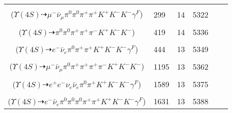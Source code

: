 \documentclass[landscape]{article}
\newcounter{rownumbers}
\newcommand\rn{\stepcounter{rownumbers}\arabic{rownumbers}}
\newcommand{\EOL}{\\} %
\newcommand{\topoTags}[1]{#1} %
\begin{document}
\begin{longtable}{clcccc}
\rn & \makecell[l]{ $ 
\Upsilon(4S) \rightarrow B^{0} \bar{B}^{0} ,
B^{0} \rightarrow \pi^{0} K^{+} K^{-} ,
\bar{B}^{0} \rightarrow \mu^{-} \bar{\nu}_{\mu} D^{*+} \gamma^{F} ,
D^{*+} \rightarrow \pi^{+} D^{0} ,
D^{0} \rightarrow \pi^{0} \pi^{+} K^{-} 
$ \\ ($
\Upsilon(4S) \dashrightarrow \mu^{-} \bar{\nu}_{\mu} \pi^{0} \pi^{0} \pi^{+} \pi^{+} K^{+} K^{-} K^{-} \gamma^{F} 
$) } & \topoTags{299 & }14 & 5322 \EOL

\rn & \makecell[l]{ $ 
\Upsilon(4S) \rightarrow B^{0} \bar{B}^{0} ,
B^{0} \rightarrow \pi^{0} K^{+} K^{-} ,
\bar{B}^{0} \rightarrow \rho^{-} D^{+} ,
\rho^{-} \rightarrow \pi^{0} \pi^{-} ,
D^{+} \rightarrow \pi^{+} \pi^{+} K^{-} 
$ \\ ($
\Upsilon(4S) \dashrightarrow \pi^{0} \pi^{0} \pi^{+} \pi^{+} \pi^{-} K^{+} K^{-} K^{-} 
$) } & \topoTags{419 & }14 & 5336 \EOL

\rn & \makecell[l]{ $ 
\Upsilon(4S) \rightarrow B^{0} \bar{B}^{0} ,
B^{0} \rightarrow \pi^{0} K^{+} K^{-} ,
\bar{B}^{0} \rightarrow e^{-} \bar{\nu}_{e} D^{*+} \gamma^{F} ,
D^{*+} \rightarrow \pi^{+} D^{0} ,
D^{0} \rightarrow \pi^{+} K^{-} 
$ \\ ($
\Upsilon(4S) \dashrightarrow e^{-} \bar{\nu}_{e} \pi^{0} \pi^{+} \pi^{+} K^{+} K^{-} K^{-} \gamma^{F} 
$) } & \topoTags{444 & }13 & 5349 \EOL

\rn & \makecell[l]{ $ 
\Upsilon(4S) \rightarrow B^{0} \bar{B}^{0} ,
B^{0} \rightarrow \pi^{0} K^{+} K^{-} ,
\bar{B}^{0} \rightarrow \mu^{-} \bar{\nu}_{\mu} D^{*+} ,
D^{*+} \rightarrow \pi^{+} D^{0} ,
D^{0} \rightarrow \pi^{+} \pi^{-} \bar{K}^{*} ,
\bar{K}^{*} \rightarrow \pi^{+} K^{-} 
$ \\ ($
\Upsilon(4S) \dashrightarrow \mu^{-} \bar{\nu}_{\mu} \pi^{0} \pi^{+} \pi^{+} \pi^{+} \pi^{-} K^{+} K^{-} K^{-} 
$) } & \topoTags{1195 & }13 & 5362 \EOL

\rn & \makecell[l]{ $ 
\Upsilon(4S) \rightarrow B^{0} \bar{B}^{0} ,
B^{0} \rightarrow \pi^{0} K^{+} K^{-} ,
\bar{B}^{0} \rightarrow e^{-} \bar{\nu}_{e} D^{*+} \gamma^{F} ,
D^{*+} \rightarrow \pi^{+} D^{0} ,
D^{0} \rightarrow e^{+} \nu_{e} K^{-} 
$ \\ ($
\Upsilon(4S) \dashrightarrow e^{+} e^{-} \nu_{e} \bar{\nu}_{e} \pi^{0} \pi^{+} K^{+} K^{-} K^{-} \gamma^{F} 
$) } & \topoTags{1589 & }13 & 5375 \EOL

\rn & \makecell[l]{ $ 
\Upsilon(4S) \rightarrow B^{0} \bar{B}^{0} ,
B^{0} \rightarrow \pi^{0} K^{+} K^{-} ,
\bar{B}^{0} \rightarrow e^{-} \bar{\nu}_{e} D^{*+} \gamma^{F} ,
D^{*+} \rightarrow \pi^{+} D^{0} ,
D^{0} \rightarrow \pi^{0} \pi^{0} \pi^{+} K^{-} 
$ \\ ($
\Upsilon(4S) \dashrightarrow e^{-} \bar{\nu}_{e} \pi^{0} \pi^{0} \pi^{0} \pi^{+} \pi^{+} K^{+} K^{-} K^{-} \gamma^{F} 
$) } & \topoTags{1631 & }13 & 5388 \EOL


\end{longtable}
\end{document}
